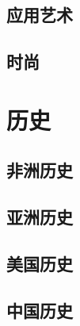 \section{应用艺术}
\section{时尚}


\chapter{历史}

\section{非洲历史}
\section{亚洲历史}
\section{美国历史}
\section{中国历史}
